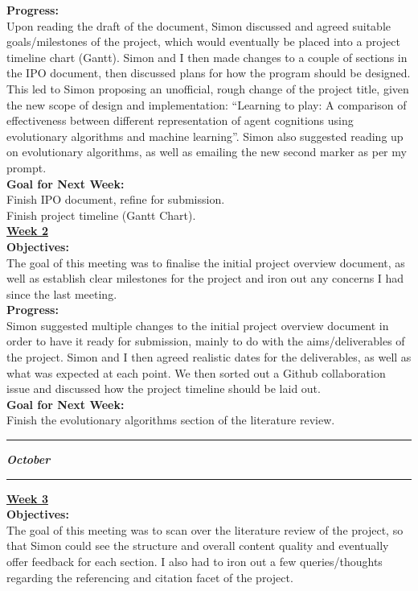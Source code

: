 \documentclass[12pt,a4paper]{article}
\begin{document}
\begin{appendices}
\textbf{Progress:} \\
Upon reading the draft of the document, Simon discussed and agreed suitable goals/milestones of the project, which would eventually be placed into a project timeline chart (Gantt). Simon and I then made changes to a couple of sections in the IPO document, then discussed plans for how the program should be designed. This led to Simon proposing an unofficial, rough change of the project title, given the new scope of design and implementation: “Learning to play: A comparison of effectiveness between different representation of agent cognitions using evolutionary algorithms and machine learning”. Simon also suggested reading up on evolutionary algorithms, as well as emailing the new second marker as per my prompt. \\

\textbf{Goal for Next Week:} \\
Finish IPO document, refine for submission. \\
Finish project timeline (Gantt Chart). \\

\textbf{\underline{Week 2}} \\
\newline
\textbf{Objectives:} \\
The goal of this meeting was to finalise the initial project overview document, as well as establish clear milestones for the project and iron out any concerns I had since the last meeting. \\

\textbf{Progress:} \\
Simon suggested multiple changes to the initial project overview document in order to have it ready for submission, mainly to do with the aims/deliverables of the project. Simon and I then agreed realistic dates for the deliverables, as well as what was expected at each point. We then sorted out a Github collaboration issue and discussed how the project timeline should be laid out.  \\

\textbf{Goal for Next Week:} \\
Finish the evolutionary algorithms section of the literature review. \\
\hrule

\textbf{\textit{October}}
\newline
\hrule
\textbf{\underline{Week 3}} \\
\newline
\textbf{Objectives:} \\
The goal of this meeting was to scan over the literature review of the project, so that Simon could see the structure and overall content quality and eventually offer feedback for each section. I also had to iron out a few queries/thoughts regarding the referencing and citation facet of the project. \\


\end{appendices}
\end{document}
